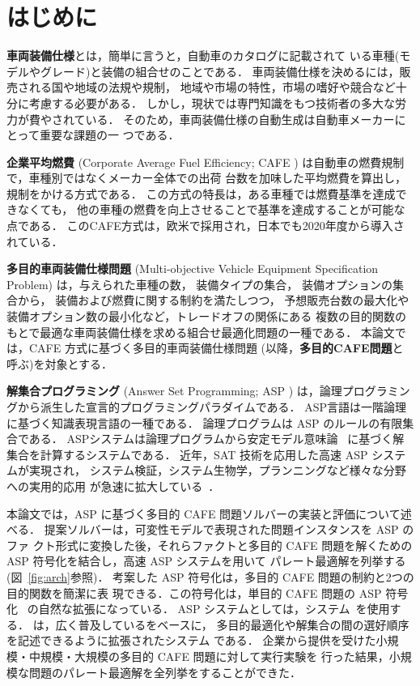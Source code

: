 \section{はじめに}\label{sec:introduction}


\textbf{車両装備仕様}とは，簡単に言うと，自動車のカタログに記載されて
いる車種(モデルやグレード)と装備の組合せのことである．
車両装備仕様を決めるには，販売される国や地域の法規や規制，
地域や市場の特性，市場の嗜好や競合など十分に考慮する必要がある．
しかし，現状では専門知識をもつ技術者の多大な労力が費やされている．
そのため，車両装備仕様の自動生成は自動車メーカーにとって重要な課題の一
つである．

\textbf{企業平均燃費}
(Corporate Average Fuel Efficiency; CAFE
\cite{mlit18:cafe})
は自動車の燃費規制で，車種別ではなくメーカー全体での出荷
台数を加味した平均燃費を算出し，規制をかける方式である．
この方式の特長は，ある車種では燃費基準を達成できなくても，
他の車種の燃費を向上させることで基準を達成することが可能な点である．
このCAFE方式は，欧米で採用され，日本でも2020年度から導入されている．

\textbf{多目的車両装備仕様問題}
(Multi-objective Vehicle Equipment Specification Problem)
は，与えられた車種の数，
装備タイプの集合，
装備オプションの集合から，
装備および燃費に関する制約を満たしつつ，
予想販売台数の最大化や装備オプション数の最小化など，トレードオフの関係にある
複数の目的関数のもとで最適な車両装備仕様を求める組合せ最適化問題の一種である．
本論文では，CAFE 方式に基づく多目的車両装備仕様問題
(以降，\textbf{多目的CAFE問題}と呼ぶ)を対象とする．

\textbf{解集合プログラミング}
(Answer Set Programming; ASP
\cite{Gelfond88:iclp})
は，論理プログラミングから派生した宣言的プログラミングパラダイムである．
ASP言語は一階論理に基づく知識表現言語の一種である．
論理プログラムは ASP のルールの有限集合である．
ASPシステムは論理プログラムから安定モデル意味論~\cite{Gelfond88:iclp}
に基づく解集合を計算するシステムである．
近年，SAT 技術を応用した高速 ASP システムが実現され，
システム検証，システム生物学，プランニングなど様々な分野への実用的応用
が急速に拡大している~\cite{Erdem16:ai-magazine}．

本論文では，ASP に基づく多目的 CAFE 問題ソルバーの実装と評価について述べる．
提案ソルバーは，可変性モデルで表現された問題インスタンスを ASP のファ
クト形式に変換した後，それらファクトと多目的 CAFE 問題を解くための ASP
符号化を結合し，高速 ASP システムを用いて
パレート最適解を列挙する(図~\ref{fig:arch}参照)．
%
考案した ASP 符号化は，多目的 CAFE 問題の制約と2つの目的関数を簡潔に表
現できる．この符号化は，単目的 CAFE 問題の ASP 符号化~\cite{Takeuchi20:jssst}
の自然な拡張になっている．
%
ASP システムとしては，{\asprin}システム~\cite{Brewka15:casp}を使用する．
{\asprin}は，広く普及している{\clingo}をベースに，
多目的最適化や解集合の間の選好順序を記述できるように拡張されたシステム
である．
%
企業から提供を受けた小規模・中規模・大規模の多目的 CAFE 問題に対して実行実験を
行った結果，小規模な問題のパレート最適解を全列挙をすることができた．

